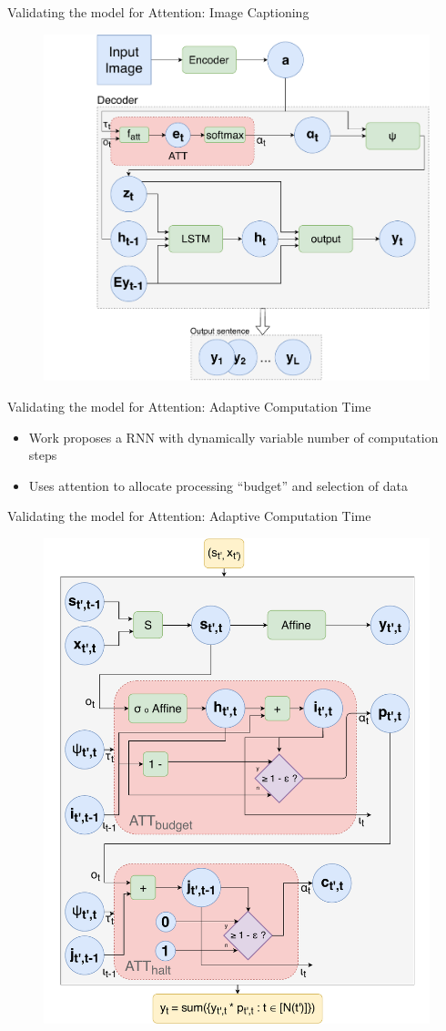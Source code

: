 \documentclass[10pt]{beamer}
\begin{document}
\begin{frame}{Validating the model for Attention: Image Captioning}
    \begin{figure}[H]
        \centering
        \includegraphics[width=0.6\linewidth]{./img/captioning.pdf}
    \label{fig:cap}
\end{figure}

\end{frame}

\begin{frame}{Validating the model for Attention: Adaptive Computation Time}
    \begin{itemize}
        \item Work proposes a RNN with dynamically variable number of computation steps
        \item Uses attention to allocate processing ``budget'' and selection of data
    \end{itemize}
\end{frame}

\begin{frame}{Validating the model for Attention: Adaptive Computation Time}
    \begin{figure}[H]
        \centering
        \includegraphics[width=0.55\linewidth]{./img/act.pdf}
    \end{figure}
\end{frame}
\end{document}
